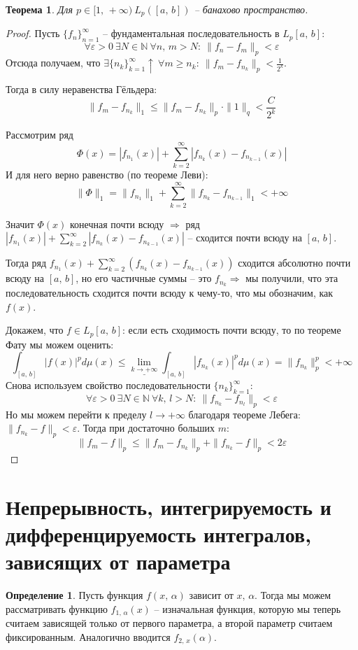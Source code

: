 \documentclass[a4paper,12pt]{article}
\renewcommand{\leq}{\ensuremath{\leqslant}}
\renewcommand{\geq}{\ensuremath{\geqslant}}
\theoremstyle{plain}
\newtheorem{theorem}{Теорема}[section]
\theoremstyle{definition}
\newtheorem{definition}{Определение}[section]
\theoremstyle{remark}
\begin{document}
\begin{theorem}
	Для $p \in [1,\,+\infty) \: L_p([a,\,b])$ -- банахово пространство.
\end{theorem}

\begin{proof}
	Пусть $\{f_n\}_{n = 1}^\infty$ -- фундаментальная последовательность в $L_p[a,\,b]$:
	\[\forall \varepsilon > 0 \: \exists N \in \mathbb{N} \: \forall n,\,m > N :\: \|f_n - f_m\|_p < \varepsilon\]
	Отсюда получаем, что $\exists \{n_k\}_{k = 1}^\infty \uparrow \: \forall m \geq n_k :\: \|f_m - f_{n_k}\|_p < \frac{1}{2^k}$.

	Тогда в силу неравенства Гёльдера:
	\[\|f_m - f_{n_k}\|_1 \leq \|f_m - f_{n_k}\|_p \cdot \|1\|_q < \frac{C}{2^k}\]

	Рассмотрим ряд
	\[\Phi(x) = |f_{n_1}(x)| + \sum_{k = 2}^\infty |f_{n_k}(x) - f_{n_{k-1}}(x)|\]
	И для него верно равенство (по теореме Леви):
	\[\|\Phi\|_1 = \|f_{n_1}\|_1 + \sum_{k = 2}^\infty \|f_{n_k} - f_{n_{k-1}}\|_1 < +\infty\]

	Значит $\Phi(x)$ конечная почти всюду $\Rightarrow$ ряд $|f_{n_1}(x)| + \sum_{k = 2}^\infty |f_{n_k}(x) - f_{n_{k-1}}(x)|$ -- сходится почти всюду на $[a,\,b]$.

	Тогда ряд $f_{n_1}(x) + \sum_{k = 2}^\infty (f_{n_k}(x) - f_{n_{k-1}}(x))$ сходится абсолютно почти всюду на $[a,\,b]$, но его частичные суммы -- это $f_{n_k} \Rightarrow$ мы получили, что эта последовательность сходится почти всюду к чему-то, что мы обозначим, как $f(x)$.

	Докажем, что $f \in L_p[a,\,b]$: если есть сходимость почти всюду, то по теореме Фату мы можем оценить:
	\[\int_{[a,\,b]}|f(x)|^pd\mu(x) \leq \underline{\lim\limits_{k \to +\infty}} \int_{[a,\,b]}|f_{n_k}(x)|^pd\mu(x) = \|f_{n_k}\|_p^p < +\infty\]
	Снова используем свойство последовательности $\{n_k\}_{k = 1}^\infty$:
	\[\forall \varepsilon > 0 \: \exists N \in \mathbb{N} \: \forall k,\,l > N :\: \|f_{n_k} - f_{n_l}\|_p < \varepsilon\]
	Но мы можем перейти к пределу $l \to +\infty$ благодаря теореме Лебега: $\|f_{n_k} - f\|_p < \varepsilon$. Тогда при достаточно больших $m$:
	\[\|f_m - f\|_p \leq \|f_m - f_{n_k}\|_p + \|f_{n_k} - f\|_p < 2\varepsilon\]
\end{proof}

\section{Непрерывность, интегрируемость и дифференцируемость интегралов, зависящих от параметра}
\begin{definition}
	Пусть функция $f(x,\,\alpha)$ зависит от $x,\, \alpha$. Тогда мы можем рассматривать функцию $f_{1,\,\alpha}(x)$ -- изначальная функция, которую мы теперь считаем зависящей только от первого параметра, а второй параметр считаем фиксированным. Аналогично вводится $f_{2,\,x}(\alpha)$.
\end{definition}
\end{document}
